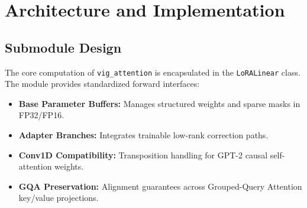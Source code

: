 \section{Architecture and Implementation}

\subsection{Submodule Design}
The core computation of \texttt{vig_attention} is encapsulated in the \texttt{LoRALinear} class. The module provides standardized forward interfaces:
\begin{itemize}
\item \textbf{Base Parameter Buffers:} Manages structured weights and sparse masks in FP32/FP16.
\item \textbf{Adapter Branches:} Integrates trainable low-rank correction paths.
\item \textbf{Conv1D Compatibility:} Transposition handling for GPT-2 causal self-attention weights.
\item \textbf{GQA Preservation:} Alignment guarantees across Grouped-Query Attention key/value projections.
\end{itemize}
